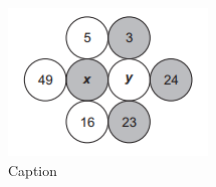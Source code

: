 \documentclass[12pt, a4paper]{article}
\begin{document}
\begin{figure}
    \centering
    \includegraphics{Figuras/ex2enc1.png}
    \caption{Caption}
    \label{fig:my_label}
\end{figure}
\end{document}
